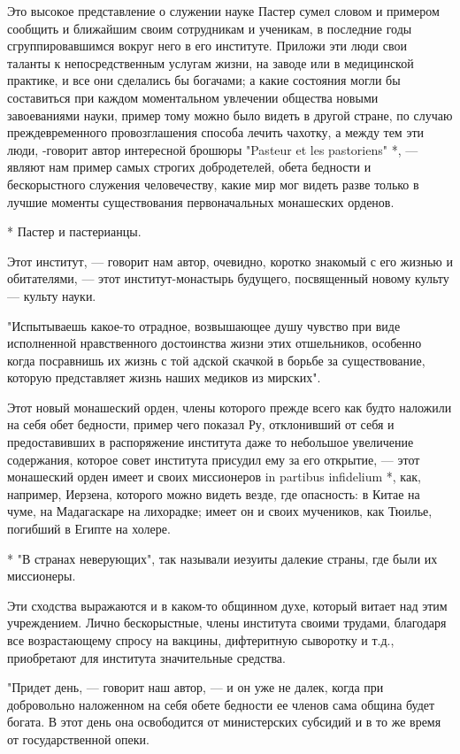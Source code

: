 Это высокое  представление  о  служении  науке  Пастер  сумел  словом  и
примером сообщить и ближайшим своим сотрудникам и ученикам, в  последние
годы сгруппировавшимся вокруг  него в  его институте.  Приложи эти  люди
свои  таланты  к  непосредственным  услугам  жизни,  на  заводе  или   в
медицинской практике, и все они сделались бы богачами; а какие состояния
могли бы составиться при  каждом моментальном увлечении общества  новыми
завоеваниями науки, пример тому  можно было видеть  в другой стране,  по
случаю преждевременного провозглашения способа  лечить чахотку, а  между
тем  эти  люди,  -говорит  автор  интересной  брошюры  "Pasteur  et  les
pastoriens" *, ---  являют нам  пример самых  строгих добродетелей,  обета
бедности и  бескорыстного служения  человечеству, какие  мир мог  видеть
разве только в  лучшие моменты  существования первоначальных  монашеских
орденов.

* Пастер и пастерианцы.

Этот институт, ---  говорит нам  автор, очевидно, коротко  знакомый с  его
жизнью и обитателями,  --- этот  институт-монастырь будущего,  посвященный
новому культу --- культу науки.

"Испытываешь какое-то отрадное, возвышающее душу чувство при виде
исполненной нравственного достоинства жизни этих отшельников, особенно
когда посравнишь их жизнь с той адской скачкой в борьбе за
существование, которую представляет жизнь наших медиков из мирских".

Этот новый  монашеский  орден, члены  которого  прежде всего  как  будто
наложили на себя обет бедности,  пример чего показал Ру, отклонивший  от
себя  и  предоставивших  в  распоряжение  института  даже  то  небольшое
увеличение содержания,  которое  совет  института присудил  ему  за  его
открытие, --- этот монашеский орден имеет и своих миссионеров in  partibus
infidelium *, как, например, Иерзена,  которого можно видеть везде,  где
опасность: в Китае  на чуме,  на Мадагаскаре  на лихорадке;  имеет он  и
своих мучеников, как Тюилье, погибший в Египте на холере.

* "В странах неверующих", так называли иезуиты далекие страны, где
были их миссионеры.

Эти сходства выражаются и в  каком-то общинном духе, который витает  над
этим учреждением. Лично  бескорыстные, члены  института своими  трудами,
благодаря все  возрастающему спросу  на вакцины,  дифтеритную  сыворотку
и т.д., приобретают для института значительные средства.

"Придет день, --- говорит наш автор, --- и он уже не далек, когда при
добровольно наложенном на себя обете бедности ее членов сама община
будет богата. В этот день она освободится от министерских субсидий и в
то же время от государственной опеки.

